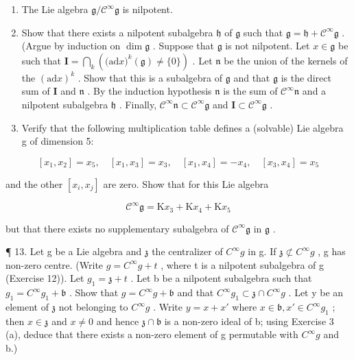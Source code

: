 \begin{enumerate}
\def\labelenumi{(\alph{enumi})}
\item
  The Lie algebra \(\mathfrak{g} / \mathcal{C}^{\infty}\mathfrak{g}\) is nilpotent.
\item
  Show that there exists a nilpotent subalgebra \(\mathfrak{h}\) of \(\mathfrak{g}\) such that \(\mathfrak{g} = \mathfrak{h} + \mathcal{C}^{\infty}\mathfrak{g}\) . (Argue by induction on \(\dim \mathfrak{g}\) . Suppose that \(\mathfrak{g}\) is not nilpotent. Let \(x\in \mathfrak{g}\) be such that \(\mathbf{I} = \bigcap_{k}\left(\mathrm{(ad}x)^{k}(\mathfrak{g})\neq \{0\}\right)\) . Let \(\mathfrak{n}\) be the union of the kernels of the \((\mathrm{ad}x)^k\) . Show that this is a subalgebra of \(\mathfrak{g}\) and that \(\mathfrak{g}\) is the direct sum of \(\mathbf{I}\) and \(\mathfrak{n}\) . By the induction hypothesis \(\mathfrak{n}\) is the sum of \(\mathcal{C}^{\infty}\mathfrak{n}\) and a nilpotent subalgebra \(\mathfrak{h}\) . Finally, \(\mathcal{C}^{\infty}\mathfrak{n}\subset \mathcal{C}^{\infty}\mathfrak{g}\) and \(\mathbf{I}\subset \mathcal{C}^{\infty}\mathfrak{g}\) .
\item
  Verify that the following multiplication table defines a (solvable) Lie algebra g of dimension 5:
\end{enumerate}

\[
\left[ x _ {1}, x _ {2} \right] = x _ {5}, \quad \left[ x _ {1}, x _ {3} \right] = x _ {3}, \quad \left[ x _ {1}, x _ {4} \right] = - x _ {4}, \quad \left[ x _ {3}, x _ {4} \right] = x _ {5}
\]

and the other \([x_i, x_j]\) are zero. Show that for this Lie algebra

\[
\mathcal {C} ^ {\infty} \mathfrak {g} = \mathrm{K} x _ {3} + \mathrm{K} x _ {4} + \mathrm{K} x _ {5}
\]

but that there exists no supplementary subalgebra of \(\mathcal{C}^{\infty}\mathfrak{g}\) in \(\mathfrak{g}\) .

¶ 13. Let g be a Lie algebra and \(\mathfrak{z}\) the centralizer of \(C^{\infty}g\) in g. If \(\mathfrak{z} \not\subset C^{\infty}g\) , g has non-zero centre. (Write \(g = C^{\infty}g + t\) , where t is a nilpotent subalgebra of g (Exercise 12)). Let \(g_{1} = \mathfrak{z} + t\) . Let b be a nilpotent subalgebra such that \(g_{1} = C^{\infty}g_{1} + \mathfrak{b}\) . Show that \(g = C^{\infty}g + \mathfrak{b}\) and that \(C^{\infty}g_{1} \subset \mathfrak{z} \cap C^{\infty}g\) . Let y be an element of \(\mathfrak{z}\) not belonging to \(C^{\infty}g\) . Write \(y = x + x'\) where \(x \in \mathfrak{b}, x' \in C^{\infty}g_{1}\) ; then \(x \in \mathfrak{z}\) and \(x \neq 0\) and hence \(\mathfrak{z} \cap \mathfrak{b}\) is a non-zero ideal of b; using Exercise 3 (a), deduce that there exists a non-zero element of g permutable with \(C^{\infty}g\) and b.)

